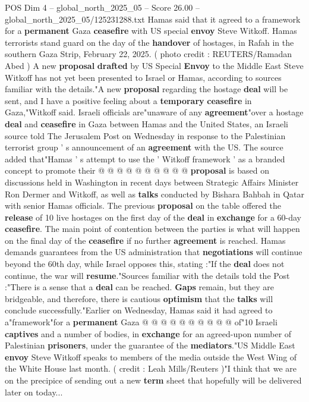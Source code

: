 \begin{textsample}{POS Dim 4 – global\_north\_2025\_05 – Score 26.00 – global\_north\_2025\_05/125231288.txt}  \label{ex:f4_pos_195}
Hamas said that it agreed to a framework for a \textbf{permanent} Gaza \textbf{ceasefire} with US special \textbf{envoy} Steve Witkoff.
Hamas terrorists stand guard on the day of the \textbf{handover} of hostages, in Rafah in the southern Gaza Strip, February 22, 2025. ( photo credit : REUTERS/Ramadan Abed ) A new \textbf{proposal} \textbf{drafted} by US Special \textbf{Envoy} to the Middle East Steve Witkoff has not yet been presented to Israel or Hamas, according to sources familiar with the details."A new \textbf{proposal} regarding the hostage \textbf{deal} will be sent, and I have a positive feeling about a \textbf{temporary} \textbf{ceasefire} in Gaza,"Witkoff said.
Israeli officials are"unaware of any \textbf{agreement}"over a hostage \textbf{deal} and \textbf{ceasefire} in Gaza between Hamas and the United States, an Israeli source told The Jerusalem Post on Wednesday in response to the Palestinian terrorist group ' s announcement of an \textbf{agreement} with the US.
The source added that"Hamas ' s attempt to use the ' Witkoff framework ' as a branded concept to promote their @ @ @ @ @ @ @ @ @ @ \textbf{proposal} is based on discussions held in Washington in recent days between Strategic Affairs Minister Ron Dermer and Witkoff, as well as \textbf{talks} conducted by Bishara Bahbah in Qatar with senior Hamas officials.
The previous \textbf{proposal} on the table offered the \textbf{release} of 10 live hostages on the first day of the \textbf{deal} in \textbf{exchange} for a 60-day \textbf{ceasefire}.
The main point of contention between the parties is what will happen on the final day of the \textbf{ceasefire} if no further \textbf{agreement} is reached.
Hamas demands guarantees from the US administration that \textbf{negotiations} will continue beyond the 60th day, while Israel opposes this, stating :"If the \textbf{deal} does not continue, the war will \textbf{resume}."Sources familiar with the details told the Post :"There is a sense that a \textbf{deal} can be reached. \textbf{Gaps} remain, but they are bridgeable, and therefore, there is cautious \textbf{optimism} that the \textbf{talks} will conclude successfully."Earlier on Wednesday, Hamas said it had agreed to a"framework"for a \textbf{permanent} Gaza @ @ @ @ @ @ @ @ @ @ of"10 Israeli \textbf{captives} and a number of bodies, in \textbf{exchange} for an agreed-upon number of Palestinian \textbf{prisoners}, under the guarantee of the \textbf{mediators}."US Middle East \textbf{envoy} Steve Witkoff speaks to members of the media outside the West Wing of the White House last month. ( credit : Leah Mills/Reuters )"I think that we are on the precipice of sending out a new \textbf{term} sheet that hopefully will be delivered later on today...

\end{textsample}
